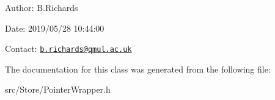 \begin{DoxyParagraph}{Author\-:}
B.\-Richards 
\end{DoxyParagraph}
\begin{DoxyParagraph}{Date\-:}
2019/05/28 10\-:44\-:00 
\end{DoxyParagraph}
Contact\-: \href{mailto:b.richards@qmul.ac.uk}{\tt b.\-richards@qmul.\-ac.\-uk} 

The documentation for this class was generated from the following file\-:\begin{DoxyCompactItemize}
\item 
src/\-Store/Pointer\-Wrapper.\-h\end{DoxyCompactItemize}

